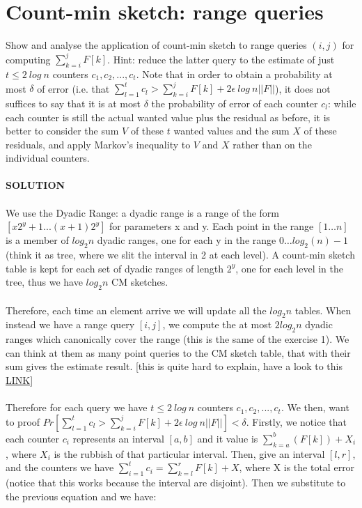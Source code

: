\documentclass[a4paper]{article}
\begin{document}
\section*{Count-min sketch: range queries}
Show and analyse the application of count-min sketch to range queries $(i,j)$ for computing  $\sum^j_{k=i} F[k]$. Hint: reduce the latter query to the estimate of just $t \leq 2\ log\ n$ counters $c_1,c_2,...,c_t$. Note that in order to obtain a probability at most $\delta$ of error (i.e. that $\sum^t_{l=1}c_l > \sum^j_{k=i}F[k] + 2\epsilon\ log\ n ||F||$), it does not suffices to say that it is at most $\delta$ the probability of error of each counter $c_l$: while each counter is still the actual wanted value plus the residual as before, it is better to consider the sum $V$ of these $t$ wanted values and the sum $X$ of these residuals, and apply Markov's inequality to $V$ and $X$ rather than on the individual counters.
\\
\\
\textbf{SOLUTION}
\\
\\
We use the Dyadic Range: a dyadic range is a range of the form $[x2^y+1 . . .(x+1)2^y]$  for parameters x and y. Each point in the range $[1\dots n]$ is a member of $log_2 n$ dyadic ranges, one for each y in the range $0\dots log_2(n) − 1$ (think it as tree, where we slit the interval in 2 at each level).
A count-min sketch table is kept for each set of dyadic ranges of length $2^y$, one for each level in the tree, thus we have $log_2 n$ CM sketches.
\\
\\
Therefore, each time an element arrive we will update all the $log_2 n$ tables. When instead we have a range query $[i,j]$,  we compute the at most $2 log_2 n$ dyadic ranges which canonically cover the range (this is the same of the exercise 1). We can think at them as many point queries to the CM sketch table, that with their sum gives the estimate result. [this is quite hard to explain, have a look to this \href{http://dimacs.rutgers.edu/~graham/pubs/papers/cm-full.pdf}{LINK}]
\\
\\
Therefore for each query we have $t \leq 2\ log\ n$ counters $c_1,c_2,...,c_t$. We then, want to proof $Pr[\sum^t_{l=1}c_l > \sum^j_{k=i}F[k] + 2\epsilon\ log\ n ||F||]<\delta$. Firstly, we notice that each counter $c_i$ represents an interval $[a,b]$ and it value is $\sum_{k=a}^b (F[k]) + X_i$, where $X_i$ is the rubbish of that particular interval. Then, give an interval $[l,r]$, and the counters we have $\sum^t_{i=1}c_i = \sum^r_{k=l}F[k] +X $, where X is the total error (notice that this works because the interval are disjoint). Then we substitute to the previous equation and we have:
\end{document}
